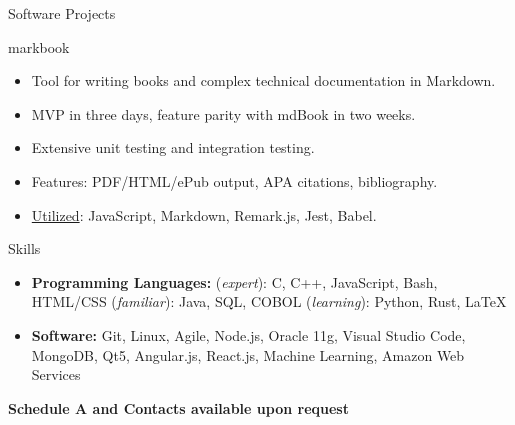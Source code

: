 \documentclass{mcdowellcv}
\begin{document}
\begin{cvsection}{Software Projects}
\begin{cvsubsection}{markbook}{}{}
      \begin{itemize}
                \item Tool for writing books and complex technical documentation in Markdown.
                \item MVP in three days, feature parity with mdBook in two weeks.
                \item Extensive unit testing and integration testing.
                \item Features: PDF/HTML/ePub output, APA citations, bibliography.
                \item \underline{Utilized}: JavaScript, Markdown, Remark.js, Jest, Babel.
              \end{itemize}
    \end{cvsubsection}
      \end{cvsection}
    
    \begin{cvsection}{Skills}
    \begin{cvsubsection}{}{}{}
      \begin{itemize}
                \item \textbf{Programming Languages: }(\textit{expert}): C, C++, JavaScript, Bash, HTML/CSS
(\textit{familiar}): Java, SQL, COBOL (\textit{learning}): Python, Rust,
LaTeX
                \item \textbf{Software: }Git, Linux, Agile, Node.js, Oracle 11g, Visual Studio Code, MongoDB,
Qt5, Angular.js, React.js, Machine Learning, Amazon Web Services
              \end{itemize}
    \end{cvsubsection}
  \end{cvsection}
    
    \textbf{\footnotesize Schedule A and Contacts available upon request}
  
\end{document}
